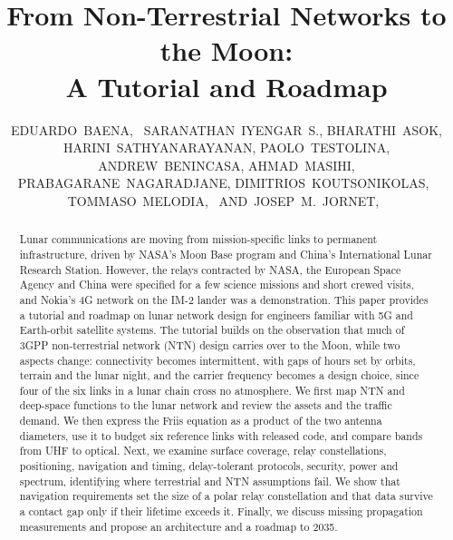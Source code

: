 \documentclass{IEEEoj}
\begin{document}

\title{\LARGE{From Non-Terrestrial Networks to the Moon: \\ A Tutorial and Roadmap}}

\author{EDUARDO~BAENA,~
        SARANATHAN~IYENGAR~S.,
        BHARATHI~ASOK,
        HARINI~SATHYANARAYANAN,
        PAOLO~TESTOLINA,
        ANDREW~BENINCASA,
        AHMAD~MASIHI,
        PRABAGARANE~NAGARADJANE,
        DIMITRIOS~KOUTSONIKOLAS,~
        TOMMASO~MELODIA,~
        AND~JOSEP~M.~JORNET,~
        }

\begin{abstract}
Lunar communications are moving from mission-specific links to permanent infrastructure, driven by NASA's Moon Base program and China's International Lunar Research Station. However, the relays contracted by NASA, the European Space Agency and China were specified for a few science missions and short crewed visits, and Nokia's 4G network on the IM-2 lander was a demonstration. This paper provides a tutorial and roadmap on lunar network design for engineers familiar with 5G and Earth-orbit satellite systems. The tutorial builds on the observation that much of 3GPP non-terrestrial network (NTN) design carries over to the Moon, while two aspects change: connectivity becomes intermittent, with gaps of hours set by orbits, terrain and the lunar night, and the carrier frequency becomes a design choice, since four of the six links in a lunar chain cross no atmosphere. We first map NTN and deep-space functions to the lunar network and review the assets and the traffic demand. We then express the Friis equation as a product of the two antenna diameters, use it to budget six reference links with released code, and compare bands from UHF to optical. Next, we examine surface coverage, relay constellations, positioning, navigation and timing, delay-tolerant protocols, security, power and spectrum, identifying where terrestrial and NTN assumptions fail. We show that navigation requirements set the size of a polar relay constellation and that data survive a contact gap only if their lifetime exceeds it. Finally, we discuss missing propagation measurements and propose an architecture and a roadmap to 2035.
\end{abstract}
\end{document}
